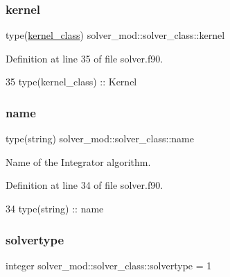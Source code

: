 \subsubsection{\texorpdfstring{kernel}{kernel}}
{\footnotesize\ttfamily type(\mbox{\hyperlink{structkernel__mod_1_1kernel__class}{kernel\+\_\+class}}) solver\+\_\+mod\+::solver\+\_\+class\+::kernel\hspace{0.3cm}{\ttfamily [private]}}



Definition at line 35 of file solver.\+f90.


\begin{DoxyCode}
35         \textcolor{keywordtype}{type}(kernel\_class) :: Kernel
\end{DoxyCode}
\mbox{\label{structsolver__mod_1_1solver__class_a0a2677f8e0403b82095b826378f9439d}} 
\subsubsection{\texorpdfstring{name}{name}}
{\footnotesize\ttfamily type(string) solver\+\_\+mod\+::solver\+\_\+class\+::name\hspace{0.3cm}{\ttfamily [private]}}



Name of the Integrator algorithm. 



Definition at line 34 of file solver.\+f90.


\begin{DoxyCode}
34         \textcolor{keywordtype}{type}(string) :: name
\end{DoxyCode}
\mbox{\label{structsolver__mod_1_1solver__class_a6bd9eec5b3a11d34981b191b54944ac4}} 
\subsubsection{\texorpdfstring{solvertype}{solvertype}}
{\footnotesize\ttfamily integer solver\+\_\+mod\+::solver\+\_\+class\+::solvertype = 1\hspace{0.3cm}{\ttfamily [private]}}



